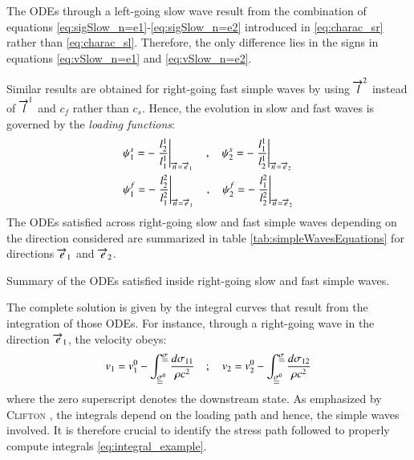 \begin{remark}
  The ODEs through a left-going slow wave result from the combination of equations \eqref{eq:sigSlow_n=e1}-\eqref{eq:sigSlow_n=e2} introduced in \eqref{eq:charac_sr} rather than \eqref{eq:charac_sl}.
  Therefore, the only difference lies in the signs in equations \eqref{eq:vSlow_n=e1} and \eqref{eq:vSlow_n=e2}.
\end{remark}

Similar results are obtained for right-going fast simple waves by using ${\overrightarrow{l}}^2$ instead of ${\overrightarrow{l}}^1$ and $c_f$ rather than $c_s$.
Hence, the evolution in slow and fast waves is governed by the \textit{loading functions}:
\begin{equation}
  \label{eq:loading_func}
  \begin{aligned}
  &\psi^s_{1}=- \left.\frac{l^1_2}{l_1^1}\right\rvert_{{\overrightarrow{n}}={\overrightarrow{e}}_1} \quad ,\quad \psi^s_{2}=- \left.\frac{l_1^1}{l_2^1}\right\rvert_{{\overrightarrow{n}}={\overrightarrow{e}}_2} \\
  &\psi^f_1=-\left.\frac{l_2^2}{l_1^2}\right\rvert_{{\overrightarrow{n}}={\overrightarrow{e}}_1}  \quad ,\quad \psi^f_2=-\left.\frac{l_1^2}{l_2^2}\right\rvert_{{\overrightarrow{n}}={\overrightarrow{e}}_2}  
  \end{aligned}
\end{equation}
The ODEs satisfied across right-going slow and fast simple waves depending on the direction considered are summarized in table \ref{tab:simpleWavesEquations} for directions ${\overrightarrow{e}}_1$ and ${\overrightarrow{e}}_2$.
\begin{table*}[h!]
  \centering
  
  \caption{Summary of the ODEs satisfied inside right-going slow and fast simple waves.}
  \label{tab:simpleWavesEquations}
\end{table*}

The complete solution is given by the integral curves that result from the integration of those ODEs.
For instance, through a right-going wave in the direction ${\overrightarrow{e}}_1$, the velocity obeys:
\begin{equation}
  \label{eq:integral_example}
  v_1 = v_1^0 - \int_{{\underline{\underline{\sigma}}}^0}^{{\underline{\underline{\sigma}}}} \frac{d \sigma_{11}}{\rho c^2} \quad ;\quad v_2 = v_2^0 - \int_{{\underline{\underline{\sigma}}}^0}^{{\underline{\underline{\sigma}}}} \frac{d \sigma_{12}}{\rho c^2}
\end{equation}
where the zero superscript denotes the downstream state.
As emphasized by \textsc{Clifton} \cite{Clifton}, the integrals depend on the loading path and hence, the simple waves involved. 
It is therefore crucial to identify the stress path followed to properly compute integrals \eqref{eq:integral_example}.

